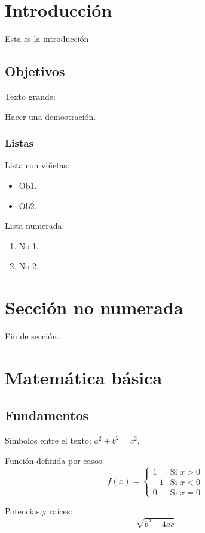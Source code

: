 \section{Introducción}
Esta es la introducción
\subsection{Objetivos}
Texto grande:
\begin{huge}
Hacer una demostración.
\end{huge}

\subsubsection{Listas}
Lista con viñetas:
\begin{itemize}
\item Ob1.
\item Ob2.
\end{itemize}

Lista numerada:
\begin{enumerate}
\item No 1.
\item No 2.
\end{enumerate}

\section*{Sección no numerada}
Fin de sección.

\section{Matemática básica}

\subsection{Fundamentos}
Símbolos entre el texto: $a^2 + b^2 = c^2$.

Función definida por casos:
\begin{equation}
f(x) = %
\begin{cases}
	1	& \text{Si } x > 0 \\
	-1	& \text{Si } x < 0 \\
	0   & \text{Si } x = 0
\end{cases}
\end{equation}

Potencias y raíces:
\begin{equation}
\sqrt{b^2 - 4ac}
\end{equation}

